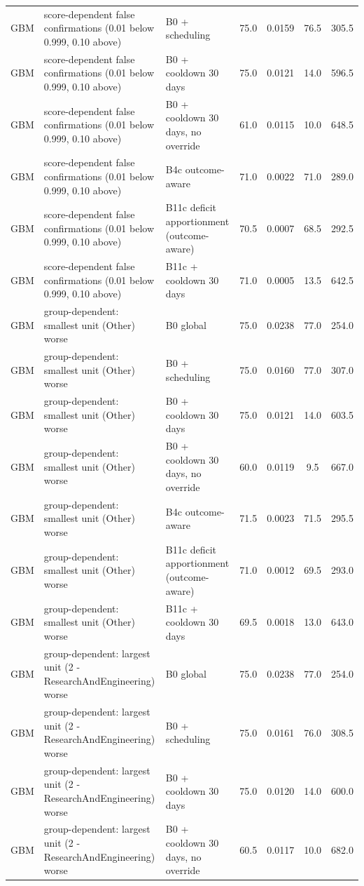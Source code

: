 \documentclass[10pt,onecolumn,letterpaper]{article}
\begin{document}
\begin{longtable}{lp{5.2cm}p{4.4cm}cccc}
GBM & score-dependent false confirmations (0.01 below 0.999, 0.10 above) & B0 + scheduling & 75.0 & 0.0159 & 76.5 & 305.5 \\
GBM & score-dependent false confirmations (0.01 below 0.999, 0.10 above) & B0 + cooldown 30 days & 75.0 & 0.0121 & 14.0 & 596.5 \\
GBM & score-dependent false confirmations (0.01 below 0.999, 0.10 above) & B0 + cooldown 30 days, no override & 61.0 & 0.0115 & 10.0 & 648.5 \\
GBM & score-dependent false confirmations (0.01 below 0.999, 0.10 above) & B4c outcome-aware & 71.0 & 0.0022 & 71.0 & 289.0 \\
GBM & score-dependent false confirmations (0.01 below 0.999, 0.10 above) & B11c deficit apportionment (outcome-aware) & 70.5 & 0.0007 & 68.5 & 292.5 \\
GBM & score-dependent false confirmations (0.01 below 0.999, 0.10 above) & B11c + cooldown 30 days & 71.0 & 0.0005 & 13.5 & 642.5 \\
GBM & group-dependent: smallest unit (Other) worse & B0 global & 75.0 & 0.0238 & 77.0 & 254.0 \\
GBM & group-dependent: smallest unit (Other) worse & B0 + scheduling & 75.0 & 0.0160 & 77.0 & 307.0 \\
GBM & group-dependent: smallest unit (Other) worse & B0 + cooldown 30 days & 75.0 & 0.0121 & 14.0 & 603.5 \\
GBM & group-dependent: smallest unit (Other) worse & B0 + cooldown 30 days, no override & 60.0 & 0.0119 & 9.5 & 667.0 \\
GBM & group-dependent: smallest unit (Other) worse & B4c outcome-aware & 71.5 & 0.0023 & 71.5 & 295.5 \\
GBM & group-dependent: smallest unit (Other) worse & B11c deficit apportionment (outcome-aware) & 71.0 & 0.0012 & 69.5 & 293.0 \\
GBM & group-dependent: smallest unit (Other) worse & B11c + cooldown 30 days & 69.5 & 0.0018 & 13.0 & 643.0 \\
GBM & group-dependent: largest unit (2 - ResearchAndEngineering) worse & B0 global & 75.0 & 0.0238 & 77.0 & 254.0 \\
GBM & group-dependent: largest unit (2 - ResearchAndEngineering) worse & B0 + scheduling & 75.0 & 0.0161 & 76.0 & 308.5 \\
GBM & group-dependent: largest unit (2 - ResearchAndEngineering) worse & B0 + cooldown 30 days & 75.0 & 0.0120 & 14.0 & 600.0 \\
GBM & group-dependent: largest unit (2 - ResearchAndEngineering) worse & B0 + cooldown 30 days, no override & 60.5 & 0.0117 & 10.0 & 682.0 \\

\end{longtable}
\end{document}
